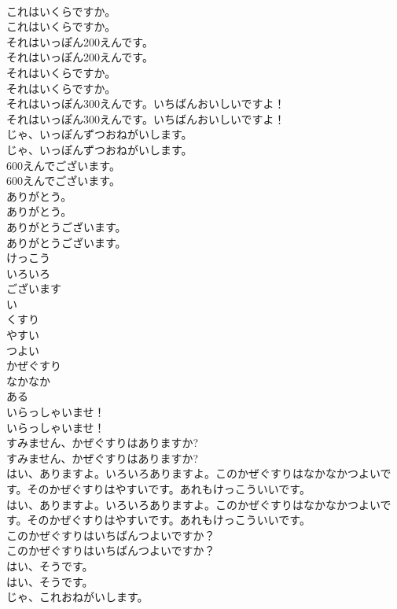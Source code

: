 \documentclass[8pt]{extreport}
\begin{document}
\begin{CJK}{UTF8}{min}
\\	これはいくらですか。	
\\	これはいくらですか。 
\\	それはいっぽん200えんです。	
\\	それはいっぽん200えんです。 
\\	それはいくらですか。	
\\	それはいくらですか。 
\\	それはいっぽん300えんです。いちばんおいしいですよ！	
\\	それはいっぽん300えんです。いちばんおいしいですよ！ 
\\	じゃ、いっぽんずつおねがいします。	
\\	じゃ、いっぽんずつおねがいします。 
\\	600えんでございます。	
\\	600えんでございます。 
\\	ありがとう。	
\\	ありがとう。 
\\	ありがとうございます。	
\\	ありがとうございます。 
\\	けっこう
\\	いろいろ
\\	ございます
\\	い
\\	くすり
\\	やすい
\\	つよい
\\	かぜぐすり
\\	なかなか
\\	ある
\\	いらっしゃいませ！	
\\	いらっしゃいませ！ 
\\	すみません、かぜぐすりはありますか?	
\\	すみません、かぜぐすりはありますか? 
\\	はい、ありますよ。いろいろありますよ。このかぜぐすりはなかなかつよいです。そのかぜぐすりはやすいです。あれもけっこういいです。	
\\	はい、ありますよ。いろいろありますよ。このかぜぐすりはなかなかつよいです。そのかぜぐすりはやすいです。あれもけっこういいです。 
\\	このかぜぐすりはいちばんつよいですか？	
\\	このかぜぐすりはいちばんつよいですか？ 
\\	はい、そうです。	
\\	はい、そうです。 
\\	じゃ、これおねがいします。	

\end{CJK}
\end{document}
